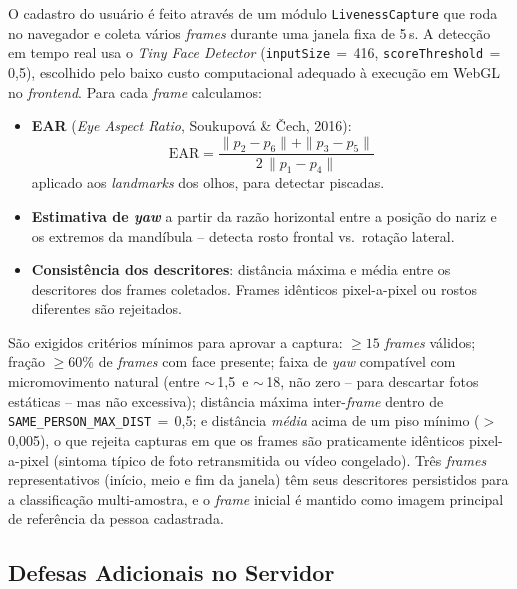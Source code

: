 \documentclass[12pt,a4paper]{article}
\begin{document}
O cadastro do usu\'ario \'e feito atrav\'es de um m\'odulo \texttt{LivenessCapture} que
roda no navegador e coleta v\'arios \emph{frames} durante uma janela fixa de 5\,s.
A detec\c{c}\~ao em tempo real usa o \emph{Tiny Face Detector} (\texttt{inputSize}\,$=$\,416,
\texttt{scoreThreshold}\,$=$\,0,5), escolhido pelo baixo custo computacional adequado
\`a execu\c{c}\~ao em WebGL no \emph{frontend}. Para cada \emph{frame} calculamos:

\begin{itemize}[leftmargin=*]
    \item \textbf{EAR} (\emph{Eye Aspect Ratio}, Soukupov\'a \& \v{C}ech, 2016):
    \[
        \mathrm{EAR} = \frac{\|p_2 - p_6\| + \|p_3 - p_5\|}{2\, \|p_1 - p_4\|}
    \]
    aplicado aos \emph{landmarks} dos olhos, para detectar piscadas.

    \item \textbf{Estimativa de \emph{yaw}} a partir da raz\~ao horizontal entre a posi\c{c}\~ao
    do nariz e os extremos da mand\'ibula -- detecta rosto frontal vs.\ rota\c{c}\~ao
    lateral.

    \item \textbf{Consist\^encia dos descritores}: dist\^ancia m\'axima e m\'edia entre os
    descritores dos frames coletados. Frames id\^enticos pixel-a-pixel ou rostos diferentes
    s\~ao rejeitados.
\end{itemize}

S\~ao exigidos crit\'erios m\'inimos para aprovar a captura:
$\geq 15$ \emph{frames} v\'alidos; fra\c{c}\~ao $\geq 60\%$ de \emph{frames} com face presente;
faixa de \emph{yaw} compat\'ivel com micromovimento natural (entre $\sim$\,1,5\textdegree\ e
$\sim$\,18\textdegree, n\~ao zero -- para descartar fotos est\'aticas -- mas n\~ao excessiva);
dist\^ancia m\'axima inter-\emph{frame} dentro de \texttt{SAME\_PERSON\_MAX\_DIST}\,$=$\,0,5;
e dist\^ancia \emph{m\'edia} acima de um piso m\'inimo ($>$\,0,005), o que rejeita capturas
em que os frames s\~ao praticamente id\^enticos pixel-a-pixel (sintoma t\'ipico de
foto retransmitida ou v\'ideo congelado). Tr\^es \emph{frames} representativos
(in\'icio, meio e fim da janela) t\^em seus descritores persistidos para a
classifica\c{c}\~ao multi-amostra, e o \emph{frame} inicial \'e mantido como imagem
principal de refer\^encia da pessoa cadastrada.

\subsection{Defesas Adicionais no Servidor}
\end{document}
